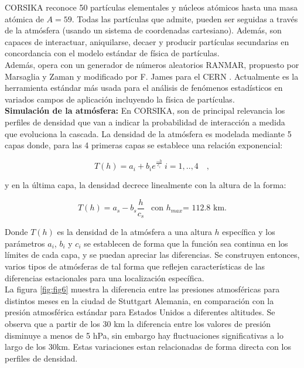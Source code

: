 CORSIKA reconoce 50 partículas elementales y núcleos atómicos hasta una masa atómica de $A = 59$. Todas las partículas que admite, pueden ser seguidas a través de la atmósfera (usando un sistema de coordenadas cartesiano). Además, son capaces de interactuar, aniquilarse, decaer y producir partículas secundarias en concordancia con el modelo estándar de física de partículas. \\

Además, opera con un generador de números aleatorios RANMAR, propuesto por Marsaglia y Zaman \cite{RANMAR1} y modificado por F. James para el CERN \cite{RANMAR2}. Actualmente es la herramienta estándar más usada para el análisis de fenómenos estadísticos en variados campos de aplicación incluyendo la física de partículas.\\

\textbf{Simulaci\'on de la atm\'osfera:} En CORSIKA, son de principal relevancia los perfiles de densidad que van a indicar la probabilidad de interacción a medida que evoluciona la cascada. La densidad de la atmósfera es modelada mediante 5 capas donde, para las 4 primeras capas se establece una relación exponencial:

\begin{equation}
T(h)=a_{i} + b_{i}e^{\frac{-h}{c_{i}}} \ i=1,..,4 \quad ,
\label{eq:eq25}
\end{equation}

y en la última capa, la densidad decrece linealmente con la altura de la forma:

\begin{equation}
T(h)=a_{s}-b_{s}\frac{h}{c_{s}} \ \ \mbox{ con $h_{max}$= 112.8 km} .
\label{eq:eq26}
\end{equation}


Donde $T(h)$ es la densidad de la atmósfera a una altura $h$ específica y los parámetros $a_{i}$, $b_{i}$ y $c_{i}$ se establecen de forma que la función sea continua en los límites de cada capa, y se puedan apreciar las diferencias. Se construyen entonces, varios tipos de atmósferas de tal forma que reflejen características de las diferencias estacionales \cite{Heck1998} para una localización específica.\\

La figura \ref{fig:fig6} muestra la diferencia entre las presiones atmosféricas para distintos meses en la ciudad de Stuttgart Alemania, en comparación con la presión atmosférica estándar para Estados Unidos a diferentes altitudes. Se observa que a partir de los 30 km la diferencia entre los valores de presión disminuye a menos de 5 hPa, sin embargo hay fluctuaciones significativas a lo largo de los 30km. Estas variaciones estan relacionadas de forma directa con los perfiles de densidad.\\

